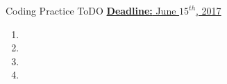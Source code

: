 
\begin{frame}{Coding Practice} {ToDO} 
\underline{\textbf{Deadline:} June $15^{th}$, 2017} 
\begin{enumerate} 
\item 
\item
\item 
\item 
\end{enumerate} 
\end{frame} 
